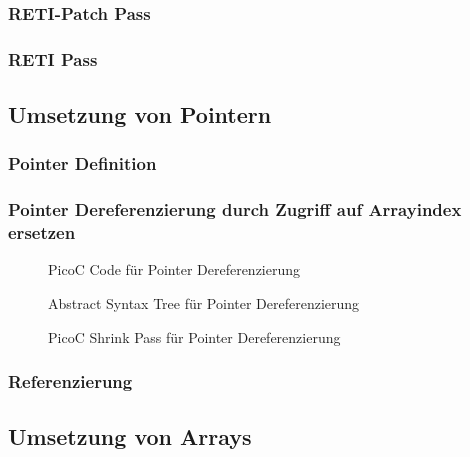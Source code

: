 \subsubsection{RETI-Patch Pass}
\subsubsection{RETI Pass}

\subsection{Umsetzung von Pointern}
\subsubsection{Pointer Definition}

\subsubsection{Pointer Dereferenzierung durch Zugriff auf Arrayindex ersetzen}
\begin{figure}[H]
  \centering
  \caption{PicoC Code für Pointer Dereferenzierung}
  \label{fig:picoc_code_für_pointer_dereferenzierung}
\end{figure}

\begin{figure}[H]
  \centering
  \caption{Abstract Syntax Tree für Pointer Dereferenzierung}
  \label{fig:abstract_syntax_tree_für_pointer_dereferenzierung}
\end{figure}

\begin{figure}[H]
  \centering
  \caption{PicoC Shrink Pass für Pointer Dereferenzierung}
  \label{fig:picoc_shrink_für_pointer_dereferenzierung}
\end{figure}

\subsubsection{Referenzierung}

\subsection{Umsetzung von Arrays}
